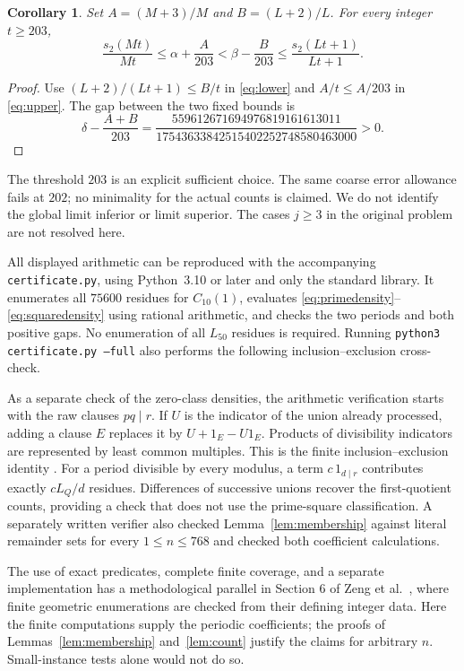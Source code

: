 \documentclass[11pt]{article}
\newtheorem{corollary}[theorem]{Corollary}
\begin{document}
\begin{corollary}\label{cor:finite}
Set $A=(M+3)/M$ and $B=(L+2)/L$. For every integer $t\ge203$,
\[
 \frac{s_2(Mt)}{Mt}\le\alpha+\frac{A}{203}
 <\beta-\frac{B}{203}\le\frac{s_2(Lt+1)}{Lt+1}.
\]
\end{corollary}
\begin{proof}
Use $(L+2)/(Lt+1)\le B/t$ in \eqref{eq:lower} and $A/t\le A/203$
in \eqref{eq:upper}. The gap between the two fixed bounds is
\begin{equation}\label{eq:finitegap}
 \delta-\frac{A+B}{203}
 =\frac{559612671694976819161613011}
 {17543633842515402252748580463000}>0.
\end{equation}
\end{proof}

The threshold $203$ is an explicit sufficient choice. The same coarse
error allowance fails at $202$; no minimality for the actual counts is
claimed. We do not identify the global limit inferior or limit superior.
The cases $j\ge3$ in the original problem are not resolved here.

All displayed arithmetic can be reproduced with the accompanying
\texttt{certificate.py}, using Python~3.10 or later and only the standard
library. It enumerates all $75600$ residues for $C_{10}(1)$, evaluates
\eqref{eq:primedensity}--\eqref{eq:squaredensity} using rational
arithmetic, and checks the two periods and both positive gaps.
No enumeration of all $L_{50}$ residues is required. Running
\texttt{python3 certificate.py --full} also performs the following
inclusion--exclusion cross-check.

As a separate check of the zero-class densities, the arithmetic
verification starts with the raw clauses $pq\mid r$. If $U$ is the
indicator of the union already processed, adding a clause $E$ replaces
it by $U+1_E-U1_E$. Products of divisibility indicators are represented
by least common multiples. This is the finite inclusion--exclusion
identity \cite[Theorem 8.1]{Shoup2009}. For a period divisible by every
modulus, a term $c\,1_{d\mid r}$ contributes exactly $cL_Q/d$
residues. Differences of successive unions recover the first-quotient
counts, providing a check that does not use the prime-square
classification. A separately written verifier also checked
Lemma~\ref{lem:membership} against literal remainder sets for every
$1\le n\le768$ and checked both coefficient calculations.

The use of exact predicates, complete finite coverage, and a separate
implementation has a methodological parallel in Section 6 of
Zeng et al.\ \cite{ZengEtAl2026Certificates}, where finite geometric
enumerations are checked from their defining integer data. Here the
finite computations supply the periodic coefficients; the proofs of
Lemmas~\ref{lem:membership} and~\ref{lem:count} justify the claims
for arbitrary $n$. Small-instance tests alone would not do so.
\end{document}

